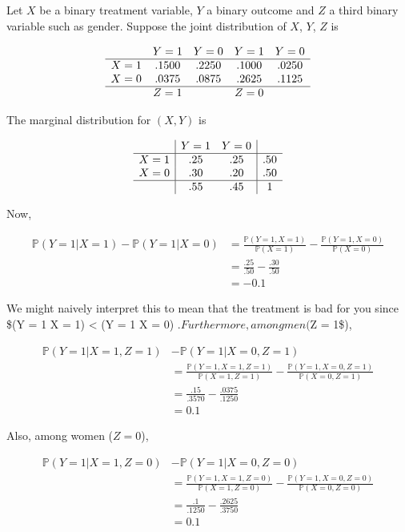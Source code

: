 Let \(X\) be a binary treatment variable, \(Y\) a binary outcome and
\(Z\) a third binary variable such as gender. Suppose the joint
distribution of \(X\), \(Y\), \(Z\) is

\[
\begin{array}{ccccc}
       & Y = 1 & Y = 0 & Y = 1 & Y = 0 \\
\hline
X = 1 & .1500 & .2250 & .1000 & .0250 \\
X = 0 & .0375 & .0875 & .2625 & .1125 \\
\hline
      & Z = 1 & & Z = 0 &
\end{array}
\]

The marginal distribution for \((X, Y)\) is

\[
\begin{array}{c|cc|c}
       & Y = 1 & Y = 0 & \\
\hline
X = 1 & .25 & .25 & .50 \\
X = 0 & .30 & .20 & .50 \\
\hline
      & .55 & .45 & 1
\end{array}
\]

Now,

\[ 
\begin{align}
\mathbb{P}(Y = 1 | X = 1) - \mathbb{P}(Y = 1 | X = 0) 
&= \frac{\mathbb{P}(Y = 1, X = 1)}{\mathbb{P}(X = 1)} - \frac{\mathbb{P}(Y = 1, X = 0)}{\mathbb{P}(X = 0)} \\
&= \frac{.25}{.50} - \frac{.30}{.50} \\
&= -0.1
\end{align}
\]

We might naively interpret this to mean that the treatment is bad for
you since \$(Y = 1 \textbar{} X = 1) \textless{} (Y
= 1 \textbar{} X = 0) \(. Furthermore, among men (\)Z = 1\$),

\[ 
\begin{align}
\mathbb{P}(Y = 1 | X = 1, Z = 1) &- \mathbb{P}(Y = 1 | X = 0, Z = 1) \\
&= \frac{\mathbb{P}(Y = 1, X = 1, Z = 1)}{\mathbb{P}(X = 1, Z = 1)} - \frac{\mathbb{P}(Y = 1, X = 0, Z = 1)}{\mathbb{P}(X = 0, Z = 1)} \\
&= \frac{.15}{.3570} - \frac{.0375}{.1250} \\
&= 0.1
\end{align}
\]

Also, among women (\(Z = 0\)),

\[ 
\begin{align}
\mathbb{P}(Y = 1 | X = 1, Z = 0) &- \mathbb{P}(Y = 1 | X = 0, Z = 0) \\
&= \frac{\mathbb{P}(Y = 1, X = 1, Z = 0)}{\mathbb{P}(X = 1, Z = 0)} - \frac{\mathbb{P}(Y = 1, X = 0, Z = 0)}{\mathbb{P}(X = 0, Z = 0)} \\
&= \frac{.1}{.1250} - \frac{.2625}{.3750} \\
&= 0.1
\end{align}
\]

